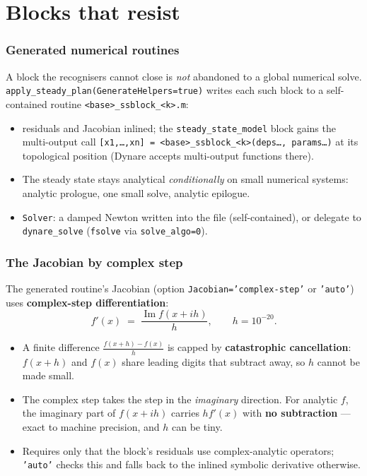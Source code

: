 \documentclass[10pt,slidestop]{beamer}
\newcommand{\code}[1]{\texttt{#1}}
\begin{document}
\section{Blocks that resist}

\begin{frame}\frametitle{Generated numerical routines}
  A block the recognisers cannot close is \emph{not} abandoned to a global
  numerical solve. \code{apply\_steady\_plan(GenerateHelpers=true)} writes each
  such block to a self-contained routine \code{<base>\_ssblock\_<k>.m}:

  \begin{itemize}
  \item residuals and Jacobian inlined; the \code{steady\_state\_model} block
    gains the multi-output call
    \code{[x1,\dots,xn] = <base>\_ssblock\_<k>(deps\dots, params\dots)} at its
    topological position (Dynare accepts multi-output functions there).\newline
  \item The steady state stays analytical \emph{conditionally} on small numerical
    systems: analytic prologue, one small solve, analytic epilogue.\newline
  \item \code{Solver}: a damped Newton written into the file (self-contained), or
    delegate to \code{dynare\_solve} (\code{fsolve} via \code{solve\_algo=0}).
  \end{itemize}
\end{frame}

\begin{frame}\frametitle{The Jacobian by complex step}
  The generated routine's Jacobian (option \code{Jacobian='complex-step'} or
  \code{'auto'}) uses \textbf{complex-step differentiation}:
  \[
    f'(x) \;=\; \frac{\operatorname{Im} f(x + i h)}{h}, \qquad h = 10^{-20}.
  \]

  \begin{itemize}
  \item A finite difference $\tfrac{f(x+h)-f(x)}{h}$ is capped by
    \textbf{catastrophic cancellation}: $f(x+h)$ and $f(x)$ share leading digits
    that subtract away, so $h$ cannot be made small.\newline
  \item The complex step takes the step in the \emph{imaginary} direction. For
    analytic $f$, the imaginary part of $f(x+ih)$ carries $h f'(x)$ with
    \textbf{no subtraction} --- exact to machine precision, and $h$ can be tiny.\newline
  \item Requires only that the block's residuals use complex-analytic operators;
    \code{'auto'} checks this and falls back to the inlined symbolic derivative
    otherwise.
  \end{itemize}
\end{frame}
\end{document}
